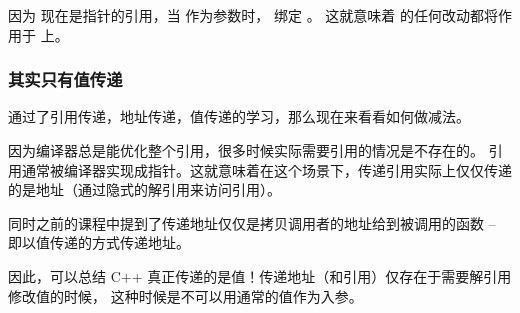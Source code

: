\documentclass[../../LearnCpp.tex]{subfiles}
\begin{document}
因为  现在是指针的引用，当  作为参数时， 绑定 。
这就意味着  的任何改动都将作用于  上。

\subsubsection*{其实只有值传递}

通过了引用传递，地址传递，值传递的学习，那么现在来看看如何做减法。

因为编译器总是能优化整个引用，很多时候实际需要引用的情况是不存在的。
引用通常被编译器实现成指针。这就意味着在这个场景下，传递引用实际上仅仅传递的是地址（通过隐式的解引用来访问引用）。

同时之前的课程中提到了传递地址仅仅是拷贝调用者的地址给到被调用的函数 -- 即以值传递的方式传递地址。

因此，可以总结 C++ 真正传递的是值！传递地址（和引用）仅存在于需要解引用修改值的时候，
这种时候是不可以用通常的值作为入参。
\end{document}
